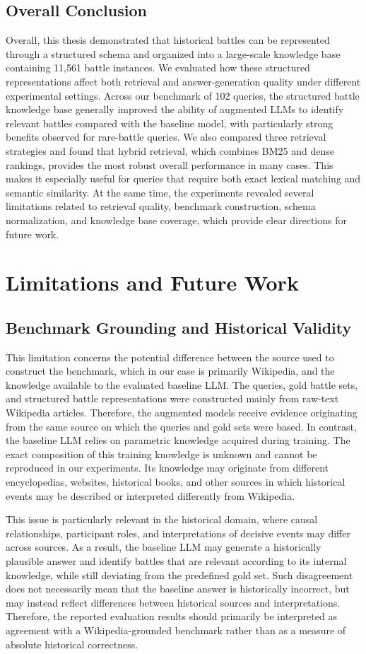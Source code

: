 \subsection{Overall Conclusion}
Overall, this thesis demonstrated that historical battles can be represented through a structured schema and organized into a large-scale knowledge base containing 11,561 battle instances. We evaluated how these structured representations affect both retrieval and answer-generation quality under different experimental settings. Across our benchmark of 102 queries, the structured battle knowledge base generally improved the ability of augmented LLMs to identify relevant battles compared with the baseline model, with particularly strong benefits observed for rare-battle queries. We also compared three retrieval strategies and found that hybrid retrieval, which combines BM25 and dense rankings, provides the most robust overall performance in many cases. This makes it especially useful for queries that require both exact lexical matching and semantic similarity. At the same time, the experiments revealed several limitations related to retrieval quality, benchmark construction, schema normalization, and knowledge base coverage, which provide clear directions for future work.
\section{Limitations and Future Work}
\subsection{Benchmark Grounding and Historical Validity}
This limitation concerns the potential difference between the source used to construct the benchmark, which in our case is primarily Wikipedia, and the knowledge available to the evaluated baseline LLM. The queries, gold battle sets, and structured battle representations were constructed mainly from raw-text Wikipedia articles. Therefore, the augmented models receive evidence originating from the same source on which the queries and gold sets were based. In contrast, the baseline LLM relies on parametric knowledge acquired during training. The exact composition of this training knowledge is unknown and cannot be reproduced in our experiments. Its knowledge may originate from different encyclopedias, websites, historical books, and other sources in which historical events may be described or interpreted differently from Wikipedia.

This issue is particularly relevant in the historical domain, where causal relationships, participant roles, and interpretations of decisive events may differ across sources. As a result, the baseline LLM may generate a historically plausible answer and identify battles that are relevant according to its internal knowledge, while still deviating from the predefined gold set. Such disagreement does not necessarily mean that the baseline answer is historically incorrect, but may instead reflect differences between historical sources and interpretations. Therefore, the reported evaluation results should primarily be interpreted as agreement with a Wikipedia-grounded benchmark rather than as a measure of absolute historical correctness.

